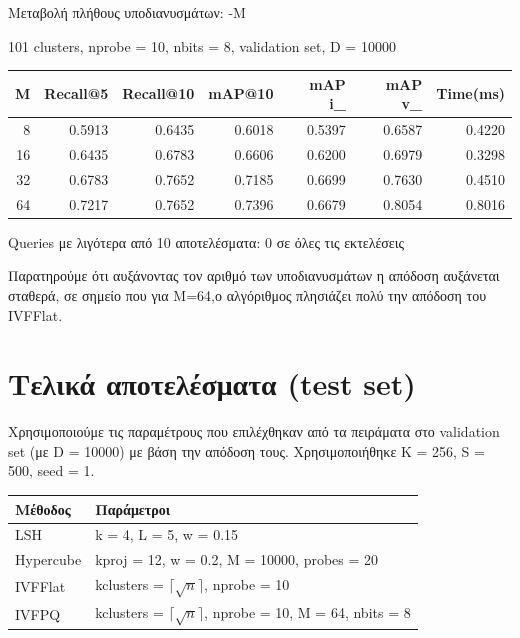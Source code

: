 \documentclass [conference]{IEEEtran}
\begin{document}
Μεταβολή πλήθους υποδιανυσμάτων: -M
\begin{table}[H]
    \centering
    \footnotesize
    \setlength{\tabcolsep}{3pt}
    101 clusters, nprobe = 10, nbits = 8, validation set, D = 10000
    \par\smallskip
    \begin{tabular}{r r r r r r r}
    \hline
    \textbf{M} & \textbf{Recall@5} & \textbf{Recall@10} & \textbf{mAP@10} & \textbf{mAP i\_} & \textbf{mAP v\_} & \textbf{Time(ms)} \\
    \hline
    8  & 0.5913 & 0.6435 & 0.6018 & 0.5397 & 0.6587 & 0.4220 \\
    16 & 0.6435 & 0.6783 & 0.6606 & 0.6200 & 0.6979 & 0.3298 \\
    32 & 0.6783 & 0.7652 & 0.7185 & 0.6699 & 0.7630 & 0.4510 \\
    64 & 0.7217 & 0.7652 & 0.7396 & 0.6679 & 0.8054 & 0.8016 \\
    \hline
    \end{tabular}
    \par\smallskip
    \footnotesize Queries με λιγότερα από 10 αποτελέσματα: 0 σε όλες τις εκτελέσεις
\end{table}

Παρατηρούμε ότι αυξάνοντας τον αριθμό των υποδιανυσμάτων η απόδοση αυξάνεται σταθερά, σε σημείο που για M=64,ο αλγόριθμος πλησιάζει πολύ την απόδοση του IVFFlat.


\section{Τελικά αποτελέσματα (test set)}

Χρησιμοποιούμε τις παραμέτρους που επιλέχθηκαν από τα πειράματα στο validation set (με D = 10000) με βάση την απόδοση τους. Χρησιμοποιήθηκε K = 256, S = 500, seed = 1. 

\begin{table}[H]
    \centering
    \footnotesize
    \setlength{\tabcolsep}{3pt}
    \begin{tabular}{l l}
    \hline
    \textbf{Μέθοδος} & \textbf{Παράμετροι} \\
    \hline
    LSH       & k = 4, L = 5, w = 0.15 \\
    Hypercube & kproj = 12, w = 0.2, M = 10000, probes = 20 \\
    IVFFlat   & kclusters = $\lceil\sqrt{n}\rceil$, nprobe = 10 \\
    IVFPQ  & kclusters = $\lceil\sqrt{n}\rceil$, nprobe = 10, M = 64, nbits = 8 \\
    \hline
    \end{tabular}
\end{table}
\end{document}

